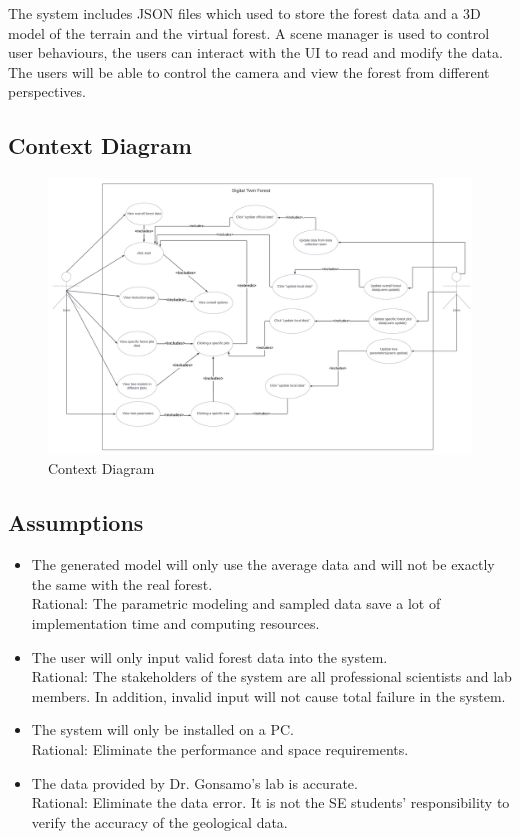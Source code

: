 \documentclass[12pt, titlepage]{article}
\begin{document}
The system includes JSON files which used to store the forest data and a 3D model of the
terrain and the virtual forest. A scene manager is used to control user behaviours, the users
can interact with the UI to read and modify the data. The users will be able to control the
camera and view the forest from different perspectives.

\subsection{Context Diagram}

\begin{figure}[H]

\caption{Context Diagram}
    \centering
    \includegraphics[scale=0.3]{SysDesPic/context.png}
    
\end{figure}

\subsection{Assumptions}
\begin{itemize}
    \item The generated model will only use the average data and will not be exactly the same
     with the real forest.\\
    Rational: The parametric modeling and sampled data save a lot of implementation time and
     computing resources.
    \item The user will only input valid forest data into the system.\\
    Rational: The stakeholders of the system are all professional scientists and lab members.
     In addition, invalid input will not cause total failure in the system.
    \item The system will only be installed on a PC.\\
    Rational: Eliminate the performance and space requirements.
    \item The data provided by Dr. Gonsamo's lab is accurate.\\
    Rational: Eliminate the data error. It is not the SE students' responsibility to verify
     the accuracy of the geological data. 
\end{itemize}
\end{document}
